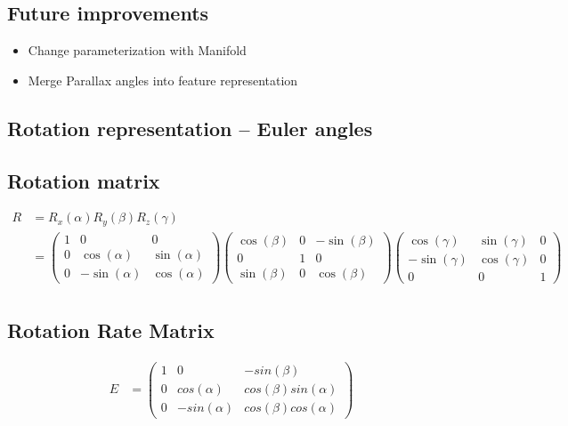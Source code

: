 \documentclass[12pt]{article}   %
\begin{document}
\subsection{Future improvements}
\begin{itemize}
	\item Change parameterization with Manifold \cite{Manifold2015}
	\item Merge Parallax angles into feature representation \cite{Parallax2015}
\end{itemize}
\newpage 
\begin{appendices}
	\section{Rotation representation -- Euler angles}
	
	\subsection{Rotation matrix}
	\begin{align*}
		R &=R_{x}(\alpha) R_{y}(\beta) R_{z}(\gamma) \nonumber \\
		  &= \begin{pmatrix} 
				1 & 0 & 0 
				\\ 0 & \cos(\alpha) & \sin(\alpha) 
				\\ 0 & -\sin(\alpha) & \cos(\alpha) 
			\end{pmatrix} 
			\begin{pmatrix} 
				\cos(\beta) & 0 & -\sin(\beta) \\ 
				0 & 1 & 0 \\ 
				\sin(\beta) &  0 & \cos(\beta) 
			\end{pmatrix} 
			\begin{pmatrix} 
				\cos(\gamma) & \sin(\gamma) & 0 
				\\ -\sin(\gamma) & \cos(\gamma) &  0 
				\\ 0 & 0 & 1 
			\end{pmatrix} \\	
		\end{align*}
		
	\subsection{Rotation Rate Matrix}
	\begin{align*}
	E &= \begin{pmatrix} 
			1 & 0 & -sin(\beta) \\ 
			0 & cos(\alpha) & cos(\beta)sin(\alpha) \\ 
			0 & -sin(\alpha) & cos(\beta)cos(\alpha) 
		 \end{pmatrix} \\
	\end{align*}
	

\end{appendices}
\end{document}
